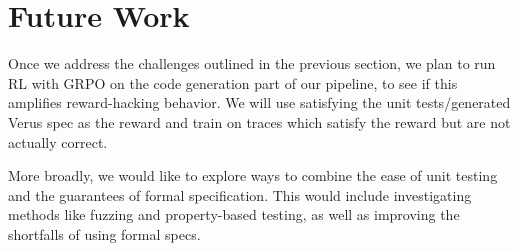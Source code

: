 \section{Future Work}
\label{futurework}

Once we address the challenges outlined in the previous section, 
we plan to run RL with GRPO
on the code generation part of our pipeline, 
to see if this amplifies reward-hacking behavior.
We will use satisfying the unit tests/generated Verus spec as the reward
and train on traces which satisfy the reward but are not actually correct. 

More broadly, we would like to explore ways to
combine the ease of unit testing and the guarantees of formal specification. 
This would include investigating methods like fuzzing and property-based testing, 
as well as improving the shortfalls of using formal specs.